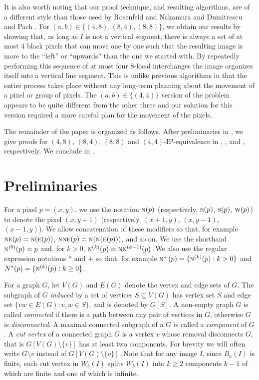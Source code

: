 \documentclass[lotsofwhite,charterfonts]{patmorin}
\newcommand{\N}{\textsc{n}}
\newcommand{\NE}{\textsc{ne}}
\newcommand{\E}{\textsc{e}}
\renewcommand{\S}{\textsc{s}}
\newcommand{\W}{\textsc{w}}
\newcommand{\sm}{\ensuremath{\setminus}}
\newcommand{\se}{\ensuremath{\subseteq}}
\begin{document}
It is also worth noting that our proof technique, and resulting
algorithms, are of a different style than those used by Rosenfeld and
Nakamura \cite{rn02} and Dumitrescu and Pach \cite{dp04}. For $(a,b)\in\{(4,8),(8,4),(8,8)\}$, we obtain
our results by showing that, as long as $I$ is not a vertical segment, there is always a set of at most $4$ black pixels that can move one by one such that the resulting image is more to the ``left'' or ``upwards'' than the one we started with. By repeatedly performing this sequence of at most four $8$-local interchanges the image organizes itself into a vertical line segment.  This is unlike
previous algorithms \cite{dp04,rn02} in that the entire process takes
place without any long-term planning about the movement of a pixel or
group of pixels. The $(a,b)\in\{(4,4)\}$ version of the problem appears to be quite different from the other three and our solution for this version required a more careful plan for the movement of the pixels. 

The remainder of the paper is organized as follows. After preliminaries in , we give proofs for $(4,8)$, $(8,4)$, $(8,8)$ and $(4,4)$-IP-equivalence in , ,  and , respectively. We conclude in .



\section{Preliminaries}
For a pixel $p=(x,y)$, we use the notation $\N(p)$ (respectively,
$\E(p)$, $\S(p)$, $\W(p)$) to denote the pixel $(x,y+1)$
(respectively, $(x+1,y)$, $(x,y-1)$, $(x-1,y)$).  We allow
concatenation of these modifiers so that, for example
$\NE(p)=\N(\E(p))$, $\N\NE(p)=\N(\N(\E(p)))$, and so on.  We use the
shorthand $\N^{(0)}(p)=p$ and, for $k>0$,
$\N^{(k)}(p)=\N\N^{(k-1)}(p)$.  We also use the regular expression
notations $*$ and $+$ so that, for example $\N^+(p)=\{\N^{(k)}(p):
k>0\}$ and $N^*(p)=\{\N^{(k)}(p): k\ge 0\}$.
 
For a graph $G$, let $V(G)$ and $E(G)$ denote the vertex and edge sets
of $G$. The subgraph of $G$ \emph{induced} by a set of vertices $S\se
V(G)$ has vertex set $S$ and edge set $\{vw\in E(G):v, w\in S\}$, and
is denoted by $G[S]$.  A non-empty graph $G$ is called
\emph{connected} if there is a path between any pair of vertices in
$G$, otherwise $G$ is \emph{disconnected}. A maximal connected
subgraph of a $G$ is called a \emph{component} of $G$. A \emph{cut
vertex} of a connected graph $G$ is a vertex $v$ whose removal
disconnects $G$, that is  $G[V(G)\sm \{v\}]$ has at least two components.
For brevity we will often write $G\sm v$ instead of $G[V(G)\sm \{v\}]$.
Note that for any image $I$, since $B_a(I)$ is finite, each cut vertex
in $W_b(I)$ splits $W_b(I)$ into $k\geq 2$ components  $k-1$ of which
are finite and one of which is infinite. 
\end{document}
